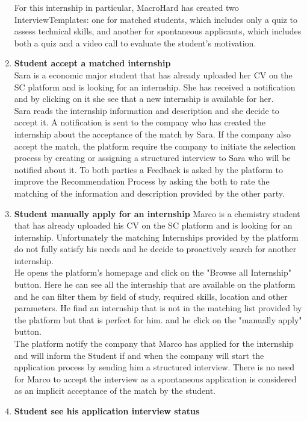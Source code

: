 \begin{enumerate}
        For this internship in particular, MacroHard has created two InterviewTemplates: one for matched students, which includes only a quiz to assess technical skills, and another for spontaneous applicants, which includes both a quiz and a video call to evaluate the student’s motivation.
    \item \textbf{Student accept a matched internship}\\
        Sara is a economic major student that has already uploaded her CV on the SC platform and is looking for an internship. She has received a notification and by clicking on it she see that a new internship is available for her.\\
        Sara reads the internship information and description and she decide to accept it. A notification is sent to the company who has created the internship about the acceptance of the match by Sara. If the company also accept the match, the platform require the company to initiate the selection process by creating or assigning a structured interview to Sara who will be notified about it.
        To both parties a Feedback is asked by the platform to improve the Recommendation Process by asking the both to rate the matching of the information and description provided by the other party.
    \item \textbf{Student manually apply for an internship}  
        Marco is a chemistry student that has already uploaded his CV on the SC platform and is looking for an internship. Unfortunately the matching Internships provided by the platform do not fully satisfy his needs and he decide to proactively search for another internship.\\
        He opens the platform's homepage and click on the "Browse all Internship" button. Here he can see all the internship that are available on the platform and he can filter them by field of study, required skills, location and other parameters.
        He find an internship that is not in the matching list provided by the platform but that is perfect for him. and he click on the "manually apply" button.\\
        The platform notify the company that Marco has applied for the internship and will inform the Student if and when the company will start the application process by sending him a structured interview. There is no need for Marco to accept the interview as a spontaneous application is considered as an implicit acceptance of the match by the student.
    \item \textbf{Student see his application  interview status}\\

\end{enumerate}
